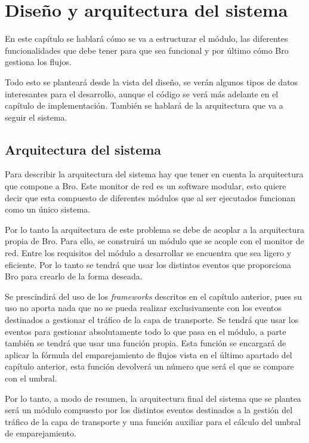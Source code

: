 \chapter{Diseño y arquitectura del sistema}\label{diseno}

En este capítulo se hablará cómo se va a estructurar el módulo, las diferentes funcionalidades que debe tener 
para que sea funcional y por último cómo Bro gestiona los flujos.

\intro Todo esto se planteará desde la vista del diseño, se verán algunos tipos de datos interesantes para el 
desarrollo, aunque el código se verá más adelante en el capítulo de implementación. También se hablará de la 
arquitectura que va a seguir el sistema.

\section{Arquitectura del sistema}

Para describir la arquitectura del sistema hay que tener en cuenta la arquitectura que compone a Bro. Este monitor 
de red es un software modular, esto quiere decir que esta compuesto de diferentes módulos que al ser ejecutados 
funcionan como un único sistema.

\intro Por lo tanto la arquitectura de este problema se debe de acoplar a la arquitectura propia de Bro. Para ello, 
se construirá un módulo que se acople con el monitor de red. Entre los requisitos del módulo a desarrollar se 
encuentra que sea ligero y eficiente. Por lo tanto se tendrá que usar los distintos eventos que proporciona Bro 
para crearlo de la forma deseada.

\intro Se prescindirá del uso de los \textit{frameworks} descritos en el capítulo anterior, pues su uso no aporta 
nada que no se pueda realizar exclusivamente con los eventos destinados a gestionar el tráfico de la capa de 
transporte. Se tendrá que usar los eventos para gestionar absolutamente todo lo que pasa en el módulo, a parte 
también se tendrá que usar una función propia. Esta función se encargará de aplicar la fórmula del emparejamiento 
de flujos vista en el último apartado del capítulo anterior, esta función devolverá un número que será el que 
se compare con el umbral.

\intro Por lo tanto, a modo de resumen, la arquitectura final del sistema que se plantea será un módulo 
compuesto por los distintos eventos destinados a la gestión del tráfico de la capa de transporte y una función 
auxiliar para el cálculo del umbral de emparejamiento. 

